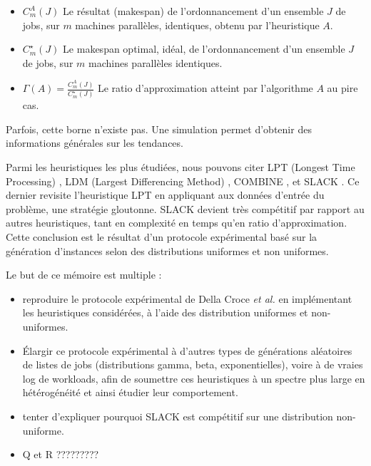 \documentclass[a4paper,12pt]{report}
\theoremstyle{plain}				%
\theoremstyle{definition}				%
\begin{document}
\begin{itemize}
\item $C_m^A(J)$ Le résultat (makespan) de l'ordonnancement
	d'un ensemble $J$ de jobs,
	sur $m$ machines parallèles, identiques,
	obtenu par l'heuristique $A$.
\item $C_m^\star(J)$ Le makespan optimal, idéal, de l'ordonnancement
	d'un ensemble $J$ de jobs,
	sur $m$ machines parallèles identiques.
\item $\Gamma(A)=\frac{C_m^A(J)}{C_m^\star(J)}$
	Le ratio d'approximation atteint par l'algorithme $A$ au pire cas.
\end{itemize}
   
  Parfois, cette borne n'existe pas. Une simulation permet d'obtenir des 
  informations générales sur les tendances.

\bigskip
Parmi les heuristiques les plus étudiées, nous pouvons citer 
  LPT (Longest Time Processing) \cite{graham1966bounds}, 
  LDM (Largest Differencing Method) \cite{karmarkar1982differencing}, 
  COMBINE \cite{lee1988multiprocessor}, et 
  SLACK \cite{della2020longest}.
Ce dernier revisite l'heuristique LPT en appliquant aux données d'entrée du problème, 
  une stratégie gloutonne. 
SLACK devient très compétitif par rapport au autres heuristiques, 
  tant en complexité en temps 
  qu'en ratio d'approximation. 
Cette conclusion est le résultat d'un protocole expérimental 
  basé sur la génération d'instances selon des 
  distributions uniformes et non uniformes.  

Le but de ce mémoire est multiple :
\begin{itemize}
\item reproduire le protocole expérimental de Della Croce \emph{et al.} 
  en implémentant les heuristiques considérées, 
  à l'aide des distribution uniformes et non-uniformes.
\item Élargir ce protocole expérimental à 
  d'autres types de générations aléatoires 
  de listes de jobs (distributions gamma, beta, exponentielles), voire 
  à de vraies log de workloads, 
  afin de soumettre ces heuristiques à un spectre plus large en 
  hétérogénéité et ainsi étudier leur comportement.    
\item tenter d'expliquer pourquoi SLACK est 
  compétitif sur une distribution non-uniforme. 
\item Q et R ?????????
\end{itemize} 
\end{document}
